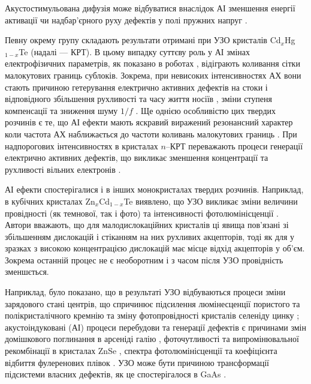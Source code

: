 Акустостимульована дифузія може відбуватися внаслідок АІ зменшення  енергії активації чи надбар'єрного руху дефектів у полі пружних напруг \cite{USdif:FTT90}.



Певну окрему групу складають результати отримані при УЗО кристалів Cd$_x$Hg$_{1-x}$Te (надалі --- КРТ).
В цьому випадку суттєву роль у АІ змінах електрофізичних параметрів, як показано в роботах \cite{KRT:FTT89,KRT:FTT90}, відіграють коливання сітки малокутових границь сублоків.
Зокрема, при невисоких інтенсивностях АХ вони стають причиною гетерування електрично активних дефектів на стоки і відповідного збільшення рухливості та часу життя носіїв \cite{KRT:FTP90}, зміни ступеня компенсації та зниження шуму $1/f$ \cite{Ol_Shav}.
Ще однією особливістю цих твердих розчинів є те, що АІ ефекти мають яскравий виражений резонансний характер коли частота АХ наближається до частоти коливань малокутових границь \cite{KRT:FTP90,KRT:FTT89,KRT:FTT90,Ol_Shav}.
При надпорогових інтенсивностях в кристалах $n$--КРТ переважають процеси генерації електрично активних дефектів, що викликає зменшення концентрації та рухливості  вільних електронів \cite{KRT:FTP90,KRT:FTT89}.

АІ ефекти спостерігалися і в інших монокристалах твердих розчинів.
Наприклад, в кубічних кристалах Zn$_x$Cd$_{1-x}$Te виявлено, що УЗО викликає зміни величини провідності (як темнової, так і фото) та інтенсивності фотолюмінісценції \cite{US:ZnCdTe}.
Автори вважають, що для малодислокаційних кристалів ці явища пов'язані зі збільшенням дислокацій і стіканням на них рухливих акцепторів, тоді як для у зразках з високою концентрацією дислокацій має місце відхід акцепторів у об'єм.
Зокрема останній процес не є необоротним і з часом після УЗО провідність зменшється.







Наприклад, було показано, що в результаті УЗО відбуваються процеси зміни зарядового стані центрів, що спричинює підсилення люмінесценції пористого \cite{Bahar2003} та полікристалічного \cite{Ostap:PhotoLum} кремнію та
зміну фотопровідності кристалів селеніду цинку \cite{US:ZnSe};
акустоіндуковані (АІ) процеси перебудови та генерації дефектів є причинами змін
домішкового поглинання в арсеніді галію \cite{Zaver2007},
фоточутливості та випромінювальної рекомбінації в кристалах ZnSe \cite{ZobovFTP2008},
спектра фотолюмінісценції та коефіцієнта відбиття фулеренових плівок \cite{RITTER2008}.
УЗО може бути причиною трансформації підсистеми власних дефектів, як це спостерігалося в GaAs \cite{Wosinski}.

